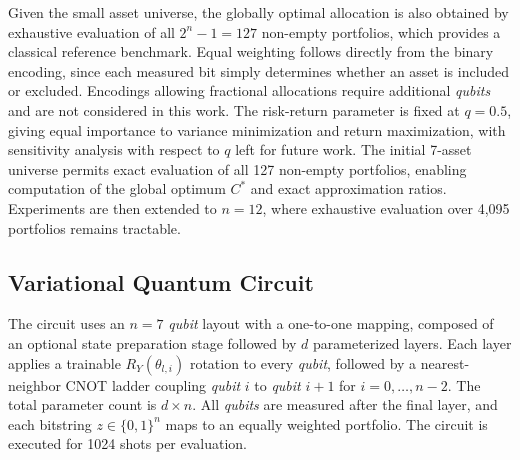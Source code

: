 \documentclass[runningheads]{llncs}
\begin{document}
Given the small asset universe, the globally optimal allocation is also obtained
by exhaustive evaluation of all $2^n - 1 = 127$ non-empty portfolios, which provides a classical reference benchmark.
Equal weighting follows directly from the binary encoding, since each measured
bit simply determines whether an asset is included or excluded. Encodings allowing fractional allocations require additional \emph{qubits} and are not considered in this work. The risk-return parameter is fixed at $q = 0.5$, giving equal importance to variance minimization and return maximization, with sensitivity analysis with respect to $q$ left for future work. The initial 7-asset universe permits exact evaluation of all 127 non-empty portfolios, enabling computation of the global optimum $C^*$ and exact approximation ratios. Experiments are then extended to $n = 12$, where exhaustive evaluation over 4,095 portfolios remains tractable.

\subsection{Variational Quantum Circuit}

The circuit uses an $n = 7$ \emph{qubit} layout with a one-to-one mapping, composed of an optional state preparation stage followed by $d$ parameterized layers. Each layer applies a trainable $R_Y(\theta_{l,i})$ rotation to every \emph{qubit}, followed by a nearest-neighbor CNOT ladder coupling \emph{qubit} $i$ to \emph{qubit} $i+1$ for $i = 0,\ldots,n-2$. The total parameter count is $d \times n$. All \emph{qubits} are measured after the final layer, and each bitstring $z \in \{0,1\}^n$ maps to an equally weighted portfolio. The circuit is executed for 1024 shots per evaluation.
\end{document}
